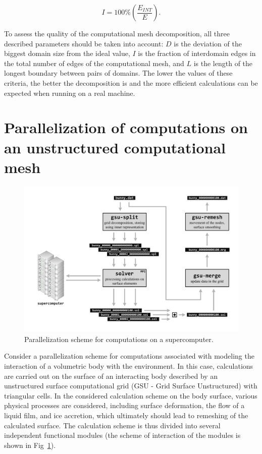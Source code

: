 \documentclass[
11pt,%
tightenlines,%
twoside,%
onecolumn,%
nofloats,%
nobibnotes,%
nofootinbib,%
superscriptaddress,%
noshowpacs,%
centertags]%
{revtex4}
\begin{document}
\begin{equation}
I = 100 \% \left( \frac{E_{INT}}{E} \right).
\end{equation}

To assess the quality of the computational mesh decomposition, all three described parameters should be taken into account: $ D $ is the deviation of the biggest domain size from the ideal value, $ I $ is the fraction of interdomain edges in the total number of edges of the computational mesh, and $ L $ is the length of the longest boundary between pairs of domains.
The lower the values of these criteria, the better the decomposition is and the more efficient calculations can be expected when running on a real machine.

\section{Parallelization of computations on an unstructured computational mesh}

\begin{figure}[h]
\includegraphics[width=1.0\textwidth]{pics/02-scheme.pdf}
\caption{Parallelization scheme for computations on a supercomputer.}\label{fig:02-scheme}
\end{figure}

Consider a parallelization scheme for computations associated with modeling the interaction of a volumetric body with the environment.
In this case, calculations are carried out on the surface of an interacting body described by an unstructured surface computational grid (GSU - Grid Surface Unstructured) with triangular cells.
In the considered calculation scheme on the body surface, various physical processes are considered, including surface deformation, the flow of a liquid film, and ice accretion, which ultimately should lead to remeshing of the calculated surface.
The calculation scheme is thus divided into several independent functional modules (the scheme of interaction of the modules is shown in Fig~\ref{fig:02-scheme}).
\end{document}
